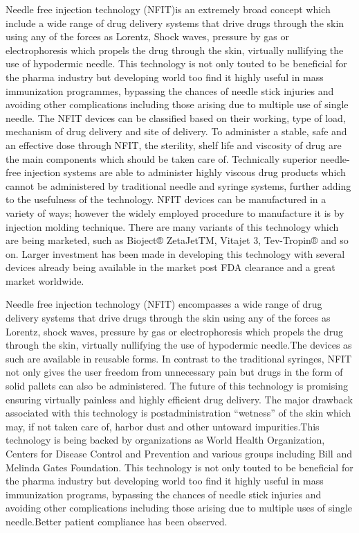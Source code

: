 \documentclass[12pt]{article}
\begin{document}
Needle free injection technology (NFIT)is an extremely broad concept which include a wide range of drug delivery systems that drive drugs through the skin using any of the forces as Lorentz, Shock waves, pressure by gas or electrophoresis which propels the drug through the skin, virtually nullifying the use of hypodermic needle. This technology is not only touted to be beneficial for the pharma industry but developing world too find it highly useful in mass immunization programmes, bypassing the chances of needle stick injuries and avoiding other complications including those arising due to multiple use of single needle. The NFIT devices can be classified based on their working, type of load, mechanism of drug delivery and site of delivery. To administer a stable, safe and an effective dose through NFIT, the sterility, shelf life and viscosity of drug are the main components which should be taken care of. Technically superior needle-free injection systems are able to administer highly viscous drug products which cannot be administered by traditional needle and syringe systems, further adding to the usefulness of the technology. NFIT devices can be manufactured in a variety of ways; however the widely employed procedure to manufacture it is by injection molding technique. There are many variants of this technology which are being marketed, such as Bioject® ZetaJetTM, Vitajet 3, Tev-Tropin® and so on. Larger investment has been made in developing this technology with several devices already being available in the market post FDA clearance and a great market worldwide.

\indent

Needle free injection technology (NFIT) encompasses a wide range of drug delivery systems that drive drugs through the skin using any of the forces as Lorentz, shock waves, pressure by gas or electrophoresis which propels the drug through the skin, virtually nullifying the use of hypodermic needle.The devices as such are available in reusable forms. In contrast to the traditional syringes, NFIT not only gives the user freedom from unnecessary pain but drugs in the form of solid pallets can also be administered. The future of this technology is promising ensuring virtually painless and highly efficient drug delivery. The major drawback associated with this technology is postadministration “wetness” of the skin which may, if not taken care of, harbor dust and other untoward impurities.This technology is being backed by organizations as World Health Organization, Centers for Disease Control and Prevention and various groups including Bill and Melinda Gates Foundation. This technology is not only touted to be beneficial for the pharma industry but developing world too find it highly useful in mass immunization programs, bypassing the chances of needle stick injuries and avoiding other complications including those arising due to multiple uses of single needle.Better patient compliance has been observed.
\end{document}
